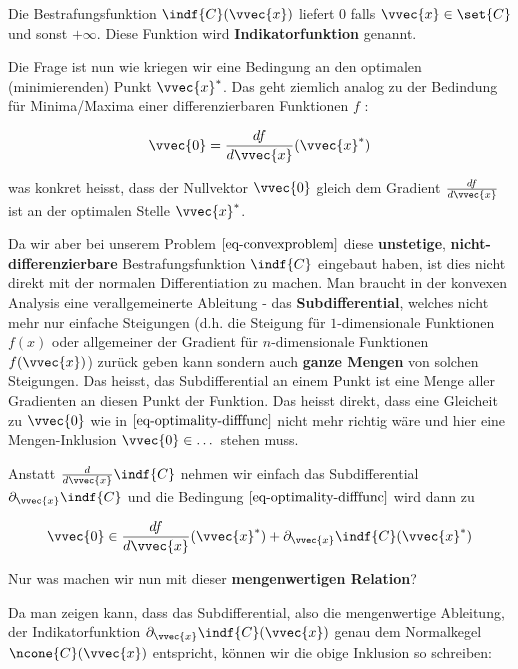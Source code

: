 \documentclass[
  12pt,
  a4paper,
  twoside,
  titlepage,
  openright,
  numbers=noenddot,
  chapterprefix=true,
  headings=optiontohead,
  svgnames,
  dvipsnames]{scrreprt}
\begin{document}
Die Bestrafungsfunktion \(\indf{C}(\vvec{x})\) liefert \(0\) falls
\(\vvec{x} \in \set{C}\) und sonst \(+\infty\). Diese Funktion wird
\textbf{Indikatorfunktion} genannt.

Die Frage ist nun wie kriegen wir eine Bedingung an den optimalen
(minimierenden) Punkt \(\vvec{x}^*\). Das geht ziemlich analog zu der
Bedindung für Minima/Maxima einer differenzierbaren Funktionen \(f\) :

\[\begin{align}
\vvec{0} = \frac{df}{d\vvec{x}}(\vvec{x}^*)
\label{eq-optimality-difffunc}
\end{align}\]

was konkret heisst, dass der Nullvektor \(\vvec{0}\) gleich dem Gradient
\(\frac{df}{d\vvec{x}}\) ist an der optimalen Stelle \(\vvec{x}^*\).

Da wir aber bei unserem Problem \(\eqref{eq-convexproblem}\) diese
\textbf{unstetige}, \textbf{nicht-differenzierbare} Bestrafungsfunktion
\(\indf{C}\) eingebaut haben, ist dies nicht direkt mit der normalen
Differentiation zu machen. Man braucht in der konvexen Analysis eine
verallgemeinerte Ableitung - das \textbf{Subdifferential}, welches nicht
mehr nur einfache Steigungen (d.h. die Steigung für \(1\)-dimensionale
Funktionen \(f(x)\) oder allgemeiner der Gradient für \(n\)-dimensionale
Funktionen \(f(\vvec{x})\)) zurück geben kann sondern auch \textbf{ganze
Mengen} von solchen Steigungen. Das heisst, das Subdifferential an einem
Punkt ist eine Menge aller Gradienten an diesen Punkt der Funktion. Das
heisst direkt, dass eine Gleicheit zu \(\vvec{0}\) wie in
\(\eqref{eq-optimality-difffunc}\) nicht mehr richtig wäre und hier eine
Mengen-Inklusion \(\vvec{0} \in \dots\) stehen muss.

Anstatt \(\frac{d}{d\vvec{x}}\indf{C}\) nehmen wir einfach das
Subdifferential \(\partial_{\vvec{x}} \indf{C}\) und die Bedingung
\(\eqref{eq-optimality-difffunc}\) wird dann zu

\[\begin{align}
\label{eq-optimality-strict-convex}
\vvec{0} \in \frac{df}{d\vvec{x}}(\vvec{x}^*) + \partial_{\vvec{x}} \indf{C}(\vvec{x}^*)
\end{align}\]

Nur was machen wir nun mit dieser \textbf{mengenwertigen Relation}?

Da man zeigen kann, dass das Subdifferential, also die mengenwertige
Ableitung, der Indikatorfunktion
\(\partial_{\vvec{x}} \indf{C}(\vvec{x})\) genau dem Normalkegel
\(\ncone{C}(\vvec{x})\) entspricht, können wir die obige Inklusion so
schreiben:
\end{document}
